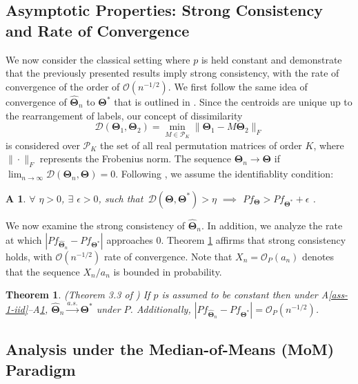 \documentclass{article}
\newcommand{\bTheta}{\boldsymbol{\Theta}}
\newcommand{\hth}{\widehat{\bTheta}_n}
\newtheorem{thm}{Theorem}[section]
\newtheorem{assumption}{A\hspace{-2pt}}
\begin{document}
\subsection{Asymptotic Properties: Strong Consistency and Rate of Convergence}

We now consider the classical setting where $p$ is held constant and demonstrate that the previously presented results imply strong consistency, with the rate of convergence of the order of $\mathcal{O}(n^{-1/2})$. We first follow the same idea of convergence of $\hth$ to $\bTheta^\ast$ that is outlined in \citep{pollard1981strong}. Since the centroids are unique up to the rearrangement of labels, our concept of dissimilarity
\[\mathcal{D}(\bTheta_1,\bTheta_2) = \min_{M \in \mathscr{P}_K} \|\bTheta_1 - M \bTheta_2\|_F \]
is considered over $\mathscr{P}_K$ the set of all real permutation matrices of order $K$, where $\|\cdot\|_F$ represents the
Frobenius norm. The sequence $\bTheta_n\to \bTheta$ if $\lim_{n\to \infty} \mathcal{D}(\bTheta_n,\bTheta)=0$. Following \citep{terada2014strong,chakraborty2020entropy}, we assume the identifiablity condition:

\begin{assumption}\label{ass-3-diss}
    $\forall$ $ \eta>0$, $\exists$ $\epsilon>0$, such that $\, \mathcal{D}(\bTheta,\bTheta^\ast)> \eta$ $\implies$ $P f_{\bTheta} > P f_{\bTheta^\ast} + \epsilon$ .
\end{assumption}

We now examine the strong consistency of $\hth$. In addition, we analyze the rate at which $|P f_{\hth} - P f_{\bTheta^\ast}|$ approaches $0$. Theorem \ref{thm-3-strong-consistency} affirms that strong consistency holds, with $\mathcal{O}(n^{-1/2})$ rate of convergence. Note that $X_n = \mathcal{O}_P(a_n)$ denotes that the sequence $X_n/a_n$ is bounded in probability.

\begin{thm}\label{thm-3-strong-consistency}
(Theorem 3.3 of \citep{paul2021uniform}) If $p$ is assumed to be constant then under  A\ref{ass-1-iid}--A\ref{ass-3-diss}, $\hth \xrightarrow{a.s.} \bTheta^\ast$ under $P$. Additionally, $|P f_{\hth} - P f_{\bTheta^\ast}| = \mathcal{O}_P (n^{-1/2})$.
\end{thm}


\subsection{Analysis under the Median-of-Means (MoM) Paradigm}
\end{document}
